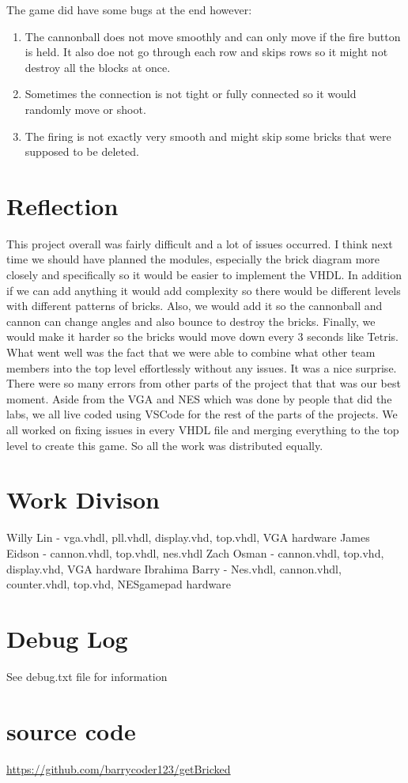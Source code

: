 \documentclass[12pt]{article}
\begin{document}
\begin{flushleft}
The game did have some bugs at the end however:\\
\begin{enumerate}
    \item The cannonball does not move smoothly and can only move if the fire
button is held. It also doe not go through each row and skips rows so it might
not destroy all the blocks at once. 
    \item Sometimes the connection is not tight or fully connected so it would randomly move or shoot.
    \item The firing is not exactly very smooth and might skip some bricks that
were supposed to be deleted.
\end{enumerate}

\section{Reflection} 
This project overall was fairly difficult and a lot of issues occurred. I think
next time we should have planned the modules, especially the brick diagram more
closely and specifically so it would be easier to implement the VHDL. In
addition if we can add anything it would add complexity so there would be
different levels with different patterns of bricks. Also, we would add it so the
cannonball and cannon can change angles and also bounce to destroy the bricks.
Finally, we would make it harder so the bricks would move down every 3 seconds
like Tetris. What went well was the fact that we were able to combine what other
team members into the top level effortlessly without any issues. It was a nice
surprise. There were so many errors from other parts of the project that that
was our best moment. Aside from the VGA and NES which was done by people that
did the labs, we all live coded using VSCode for the rest of the parts of the
projects. We all worked on fixing issues in every VHDL file and merging
everything to the top level to create this game. So all the work was distributed
equally.

\section{Work Divison} 
Willy Lin - vga.vhdl, pll.vhdl, display.vhd, top.vhdl, VGA hardware
James Eidson - cannon.vhdl, top.vhdl, nes.vhdl
Zach Osman - cannon.vhdl, top.vhd, display.vhd, VGA hardware
Ibrahima Barry - Nes.vhdl, cannon.vhdl, counter.vhdl, top.vhd, NESgamepad hardware
\section{Debug Log}
See debug.txt file for information
\section{source code}
\url{https://github.com/barrycoder123/getBricked}
\end{flushleft}
\end{document}
